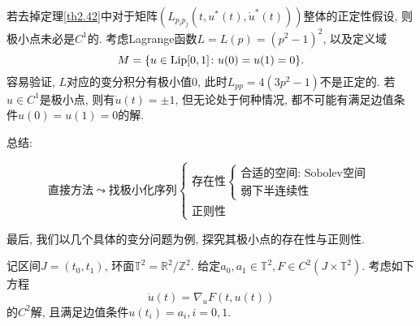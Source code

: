 \begin{example}
    若去掉定理\ref{th2.42}中对于矩阵$(L_{p_ip_j}(t, u^*(t), \dot u^*(t)))$整体的正定性假设, 则极小点未必是$C^1$的.
    考虑Lagrange函数$L = L(p) = (p^2 - 1)^2$, 以及定义域
    \begin{equation*}
        M = \{u \in {\rm Lip}[0, 1]\colon u(0) = u(1) = 0\}.
    \end{equation*}
    容易验证, $L$对应的变分积分有极小值$0$, 此时$L_{pp} = 4(3p^2 - 1)$不是正定的.
    若$u \in C^1$是极小点, 则有$\dot u(t) = \pm 1$, 但无论处于何种情况, 都不可能有满足边值条件$u(0) = u(1) = 0$的解.
\end{example}

总结:

\begin{equation*}
    \text{直接方法} \leadsto \text{找极小化序列}
    \begin{cases}
        \text{存在性}
        \begin{cases}
            \text{合适的空间: Sobolev空间} \\ 
            \text{弱下半连续性}
        \end{cases} \\ 
        \text{正则性}
    \end{cases}
\end{equation*}

最后, 我们以几个具体的变分问题为例, 探究其极小点的存在性与正则性.

\begin{example}[两点边值问题]
    记区间$J = (t_0, t_1)$, 环面$\mathbb{T}^2 = \mathbb{R}^2/\mathbb{Z}^2$.
    给定$a_0, a_1 \in \mathbb{T}^2, F \in C^2(J \times \mathbb{T}^2)$. 
    考虑如下方程 
    \begin{equation}\label{40}
        \ddot u(t) = \nabla_uF(t, u(t))
    \end{equation}
    的$C^2$解, 且满足边值条件$u(t_i) = a_i, i = 0, 1$.
\end{example}

